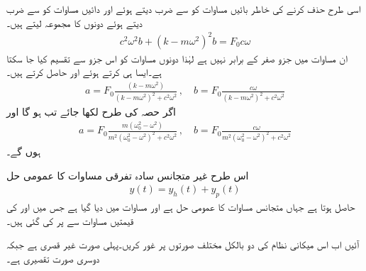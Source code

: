 اسی طرح  حذف کرنے کی خاطر بائیں مساوات کو  سے ضرب دیتے ہوئے اور دائیں مساوات کو  سے ضرب دیتے ہوئے دونوں کا مجموعہ لیتے ہیں۔
\begin{align*}
c^2\omega^2 b+(k-m\omega^2)^2b=F_0c\omega
\end{align*}
ان مساوات میں جزو  صفر کے برابر نہیں ہے لہٰذا دونوں مساوات کو اس جزو سے تقسیم کیا جا سکتا ہے۔ایسا ہی کرتے ہوئے  اور  حاصل کرتے ہیں۔
\begin{align*}
a=F_0\frac{(k-m\omega^2)}{(k-m\omega^2)^2+c^2\omega^2}\, , \quad b=F_0\frac{c\omega}{(k-m\omega^2)^2+c^2\omega^2}
\end{align*}
اگر حصہ  کی طرح  لکھا جائے تب  ہو گا اور 
\begin{align}\label{مساوات_سادہ_دو_نا_معلوم_عددی_سر_الف}
a=F_0\frac{m(\omega_0^2-\omega^2)}{m^2(\omega_0^2-\omega^2)^2+c^2\omega^2}\, , \quad b=F_0\frac{c\omega}{m^2(\omega_0^2-\omega^2)^2+c^2\omega^2}
\end{align}
ہوں گے۔

اس طرح غیر متجانس سادہ تفرقی مساوات  کا عمومی حل
\begin{align}
y(t)=y_h(t)+y_p(t)
\end{align}
حاصل ہوتا ہے جہاں  متجانس مساوات  کا عمومی حل ہے اور  مساوات  میں دیا گیا ہے جس میں  اور  کی قیمتیں مساوات  سے پر کی گئی ہیں۔

آئیں اب اس میکانی نظام کی دو بالکل مختلف صورتوں پر غور کریں۔پہلی صورت  غیر قصری ہے جبکہ دوسری صورت  تقصیری ہے۔


